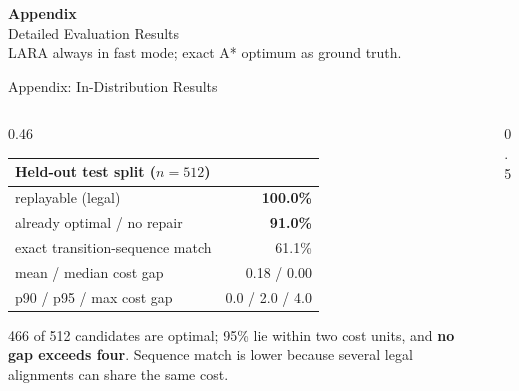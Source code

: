 \documentclass[aspectratio=169]{beamer}
\newcommand{\keyc}[1]{\textbf{\textcolor{larablue}{#1}}}
\newcommand{\keyg}[1]{\textbf{\textcolor{laraaqua!70!black}{#1}}}
\newcommand{\keya}[1]{\textbf{\textcolor{laraamber!85!black}{#1}}}
\begin{document}
\appendix

\begin{frame}
  \centering
  {\LARGE \textbf{\textcolor{larablue}{Appendix}}}\\[3mm]
  {\large Detailed Evaluation Results}\\[5mm]
  \small LARA always in fast mode; exact A* optimum as ground truth.
\end{frame}

\begin{frame}{Appendix: In-Distribution Results}
  \begin{columns}[T]
  \begin{column}{0.46\textwidth}
    \vspace{2mm}
    \begin{center}
    \small
    \begin{tabular}{lr}
      \toprule
      Held-out test split ($n = 512$) & \\
      \midrule
      replayable (legal) & \keyg{100.0\%} \\
      already optimal / no repair & \keyc{91.0\%} \\
      exact transition-sequence match & 61.1\% \\
      mean / median cost gap & 0.18 / 0.00 \\
      p90 / p95 / max cost gap & 0.0 / 2.0 / 4.0 \\
      \bottomrule
    \end{tabular}
    \end{center}
    \vspace{3mm}
    \small 466 of 512 candidates are optimal; 95\% lie within two
    cost units, and \keya{no gap exceeds four}. Sequence match is
    lower because several legal alignments can share the same cost.
  \end{column}
  \begin{column}{0.5\textwidth}
    \begin{center}
    \end{center}
  \end{column}
  \end{columns}
\end{frame}
\end{document}
